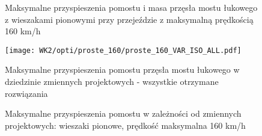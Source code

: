 \pagebreak[4]

\begin{figure}[hbt!]
	\centering
	\captionsetup{justification=centering}
	\caption{Maksymalne przyspieszenia pomostu i masa przęsła mostu łukowego z wieszakami pionowymi przy przejeździe z maksymalną prędkością 160 km/h}
	\label{fig:wk2_opti_proste_160_variables}
\end{figure}

\begin{figure}[hbt!]
	\centering
	\texttt{[image: WK2/opti/proste\_160/proste\_160\_VAR\_ISO\_ALL.pdf]}
	\captionsetup{justification=centering}
	\caption{Maksymalne przyspieszenia pomostu przęsła mostu łukowego w dziedzinie zmiennych projektowych - wszystkie otrzymane rozwiązania}
	\label{fig:wk2_opti_proste_160_vars_all}
\end{figure}
\begin{figure}[hbt!]
	\centering
	\captionsetup{justification=centering}
	\caption{Maksymalne przyspieszenia pomostu w zależności od zmiennych projektowych: wieszaki pionowe, prędkość maksymalna 160 km/h}
	\label{fig:wk2_opti_proste_160_var_2d}
\end{figure}

